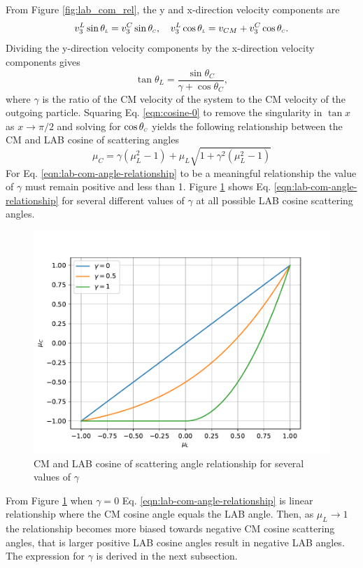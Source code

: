 From Figure \ref{fig:lab_com_rel}, the y and x-direction velocity components are
\begin{equation}
  v_{3}^L \sin \theta_{\scaleto{L}{3pt}} = v_{3}^C \sin \theta_{\scaleto{C}{3pt}}, \quad v_{3}^L \cos \theta_{\scaleto{L}{3pt}} = v_{CM} + v_{3}^C \cos \theta_{\scaleto{C}{3pt}}.
\end{equation}
Dividing the y-direction velocity components by the x-direction velocity components gives
\begin{equation} \label{eqn:cosine-0}
  \tan \theta_L = \dfrac{\sin \theta_C}{\gamma + \cos \theta_C},
\end{equation}
where $\gamma$ is the ratio of the CM velocity of the system to the CM velocity of the outgoing particle. Squaring Eq. \eqref{eqn:cosine-0} to remove the singularity in $\tan x$ as $x \rightarrow \pi/2$ and solving for $\cos \theta_{\scaleto{C}{3pt}}$ yields the following relationship between the CM and LAB cosine of scattering angles
\begin{equation} \label{eqn:lab-com-angle-relationship}
  \mu_C = \gamma (\mu_L^2 - 1) + \mu_L \sqrt{1 + \gamma^2(\mu_L^2-1)}
\end{equation}
For Eq. \eqref{eqn:lab-com-angle-relationship} to be a meaningful relationship the value of $\gamma$ must remain positive and less than 1. Figure \ref{fig:cm-lab-cosine-relationship} shows Eq. \eqref{eqn:lab-com-angle-relationship} for several different values of $\gamma$ at all possible LAB cosine scattering angles. 
\begin{figure}[!htb]
  \centering
  \includegraphics[scale=0.75]{../figures/particle_kinematics/cm_lab_angle_relationship.pdf}
  \caption{CM and LAB cosine of scattering angle relationship for several values of $\gamma$}
  \label{fig:cm-lab-cosine-relationship}
\end{figure}
From Figure \ref{fig:cm-lab-cosine-relationship} when $\gamma = 0$ Eq. \eqref{eqn:lab-com-angle-relationship} is linear relationship where the CM cosine angle equals the LAB angle. Then, as $\mu_L \rightarrow 1$ the relationship becomes more biased towards negative CM cosine scattering angles, that is larger positive LAB cosine angles result in negative LAB angles. The expression for $\gamma$ is derived in the next subsection.

